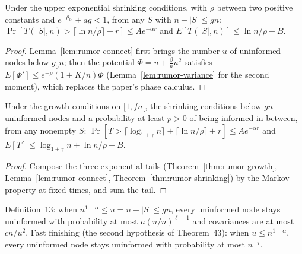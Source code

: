 \begin{theorem}\label{thm:rumor-shrinking}
\leanok{}
Under the upper exponential shrinking conditions, with $\rho$ between two positive constants and
$e^{-\rho_{lo}}+ag<1$, from any $S$ with $n-|S|\le gn$:
$\Pr[T(|S|,n)>\lceil\ln n/\rho\rceil+r]\le Ae^{-\alpha r}$ and $E[T(|S|,n)]\le\ln n/\rho+B$.
\end{theorem}
\begin{proof}\leanok
Lemma~\ref{lem:rumor-connect} first brings the number $u$ of uninformed nodes below $g_0n$; then
the potential $\Phi=u+\frac\beta nu^2$ satisfies $E[\Phi']\le e^{-\rho}(1+K/n)\Phi$
(Lemma~\ref{lem:rumor-variance} for the second moment), which replaces the paper's phase calculus.
\end{proof}

\begin{theorem}\label{thm:rumor-total}
\leanok{}
Under the growth conditions on $[1,fn[$, the shrinking conditions below $gn$ uninformed nodes and
a probability at least $p>0$ of being informed in between, from any nonempty $S$:
$\Pr[T>\lceil\log_{1+\gamma}n\rceil+\lceil\ln n/\rho\rceil+r]\le Ae^{-\alpha r}$ and
$E[T]\le\log_{1+\gamma}n+\ln n/\rho+B$.
\end{theorem}
\begin{proof}\leanok
Compose the three exponential tails (Theorem~\ref{thm:rumor-growth}, Lemma~\ref{lem:rumor-connect},
Theorem~\ref{thm:rumor-shrinking}) by the Markov property at fixed times, and sum the tail.
\end{proof}

\begin{definition}\label{def:rumor-double}
\leanok{}
Definition~13: when $n^{1-\alpha}\le u=n-|S|\le gn$, every uninformed node stays uninformed with
probability at most $a(u/n)^{\ell-1}$ and covariances are at most $cn/u^2$. Fast finishing (the
second hypothesis of Theorem~43): when $u\le n^{1-\alpha}$, every uninformed node stays
uninformed with probability at most $n^{-\tau}$.
\end{definition}

